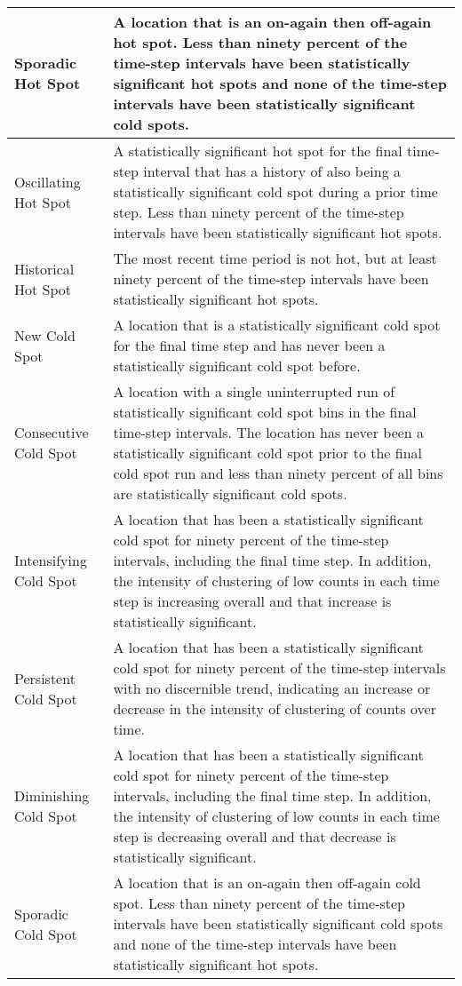 \begin{longtable}{|l|p{10cm}|}
Sporadic Hot Spot & A location that is an on-again then off-again hot spot. Less than ninety percent of the time-step intervals have been statistically significant hot spots and none of the time-step intervals have been statistically significant cold spots. \\ \hline
Oscillating Hot Spot & A statistically significant hot spot for the final time-step interval that has a history of also being a statistically significant cold spot during a prior time step. Less than ninety percent of the time-step intervals have been statistically significant hot spots. \\ \hline
Historical Hot Spot & The most recent time period is not hot, but at least ninety percent of the time-step intervals have been statistically significant hot spots. \\ \hline
New Cold Spot & A location that is a statistically significant cold spot for the final time step and has never been a statistically significant cold spot before. \\ \hline
Consecutive Cold Spot & A location with a single uninterrupted run of statistically significant cold spot bins in the final time-step intervals. The location has never been a statistically significant cold spot prior to the final cold spot run and less than ninety percent of all bins are statistically significant cold spots. \\ \hline
Intensifying Cold Spot & A location that has been a statistically significant cold spot for ninety percent of the time-step intervals, including the final time step. In addition, the intensity of clustering of low counts in each time step is increasing overall and that increase is statistically significant. \\ \hline
Persistent Cold Spot & A location that has been a statistically significant cold spot for ninety percent of the time-step intervals with no discernible trend, indicating an increase or decrease in the intensity of clustering of counts over time. \\ \hline
Diminishing Cold Spot & A location that has been a statistically significant cold spot for ninety percent of the time-step intervals, including the final time step. In addition, the intensity of clustering of low counts in each time step is decreasing overall and that decrease is statistically significant. \\ \hline
Sporadic Cold Spot & A location that is an on-again then off-again cold spot. Less than ninety percent of the time-step intervals have been statistically significant cold spots and none of the time-step intervals have been statistically significant hot spots. \\ \hline

\end{longtable}
